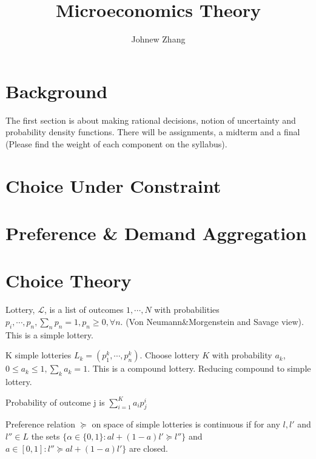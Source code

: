 \documentclass[11pt, a4paper, oneside]{article}
\title{Microeconomics Theory}
\author{Johnew Zhang}
\theoremstyle{definition}
\theoremstyle{proposition}
\theoremstyle{corollary}
\theoremstyle{lemma}
\theoremstyle{theorem}
\begin{document}
 

\def\angl#1{{%
\vbox{\hrule height .2pt 
\kern 1pt 
\hbox{$\scriptstyle {#1}\kern 1pt$}%
}\kern-.05pt \vrule width .2pt 
}} 

\def\tcelife#1{{\buildrel \circ \over e}_{#1}}

\maketitle

\hline

\tableofcontents
\addcontentsline 

\newpage

\section*{Background}
The first section is about making rational decisions, notion of uncertainty and probability density functions. There will be assignments, a midterm and a final (Please find the weight of each component on the syllabus). 

\section{Choice Under Constraint}


\section{Preference \& Demand Aggregation}


\section{Choice Theory}
Lottery, $\mathcal{L}$, is a list of outcomes $1, \cdots, N$ with probabilities $p_i, \cdots, p_n, \sum_n p_n = 1, p_n \geq 0, \forall n$. (Von Neumann\&Morgenstein and Savage view). This is a simple lottery. 

K simple lotteries $L_k = (p_1^k, \cdots, p_n^k)$. Choose lottery $K$ with probability $a_k$, $0\leq a_k \leq 1, \sum_k a_k = 1$. This is a compound lottery. Reducing compound to simple lottery. 

Probability of outcome j is $\sum_{i=1}^K a_ip_j^i$

Preference relation $\succeq$ on space of simple lotteries is continuous if for any $l, l'$ and $l'' \in L$ the sets $\{\alpha \in \{0, 1\}: al+(1-a)l'\succeq l''\}$ and $a \in[0, 1]: l''\succeq al + (1-a)l'\}$ are closed. 
\end{document}
